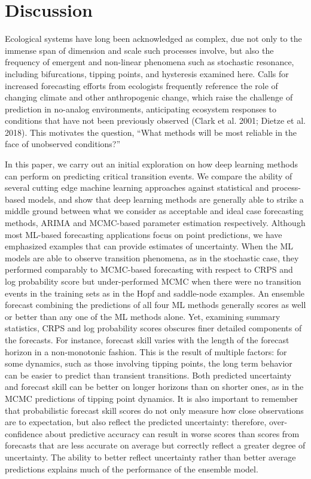 \documentclass{article}
\begin{document}
\hypertarget{discussion}{%
\section{Discussion}\label{discussion}}

Ecological systems have long been acknowledged as complex, due not only
to the immense span of dimension and scale such processes involve, but
also the frequency of emergent and non-linear phenomena such as
stochastic resonance, including bifurcations, tipping points, and
hysteresis examined here. Calls for increased forecasting efforts from
ecologists frequently reference the role of changing climate and other
anthropogenic change, which raise the challenge of prediction in
no-analog environments, anticipating ecosystem responses to conditions
that have not been previously observed (Clark et al. 2001; Dietze et al.
2018). This motivates the question, ``What methods will be most reliable
in the face of unobserved conditions?''

In this paper, we carry out an initial exploration on how deep learning
methods can perform on predicting critical transition events. We compare
the ability of several cutting edge machine learning approaches against
statistical and process-based models, and show that deep learning
methods are generally able to strike a middle ground between what we
consider as acceptable and ideal case forecasting methods, ARIMA and
MCMC-based parameter estimation respectively. Although most ML-based
forecasting applications focus on point predictions, we have emphasized
examples that can provide estimates of uncertainty. When the ML models
are able to observe transition phenomena, as in the stochastic case,
they performed comparably to MCMC-based forecasting with respect to CRPS
and log probability score but under-performed MCMC when there were no
transition events in the training sets as in the Hopf and saddle-node
examples. An ensemble forecast combining the predictions of all four ML
methods generally scores as well or better than any one of the ML
methods alone. Yet, examining summary statistics, CRPS and log
probability scores obscures finer detailed components of the forecasts.
For instance, forecast skill varies with the length of the forecast
horizon in a non-monotonic fashion. This is the result of multiple
factors: for some dynamics, such as those involving tipping points, the
long term behavior can be easier to predict than transient transitions.
Both predicted uncertainty and forecast skill can be better on longer
horizons than on shorter ones, as in the MCMC predictions of tipping
point dynamics. It is also important to remember that probabilistic
forecast skill scores do not only measure how close observations are to
expectation, but also reflect the predicted uncertainty: therefore,
over-confidence about predictive accuracy can result in worse scores
than scores from forecasts that are less accurate on average but
correctly reflect a greater degree of uncertainty. The ability to better
reflect uncertainty rather than better average predictions explains much
of the performance of the ensemble model.
\end{document}
